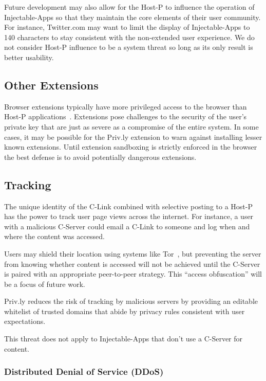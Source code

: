 \documentclass[letterpaper,twocolumn,10pt]{article}
\begin{document}
Future development may also allow for the Host-P to influence the operation of 
Injectable-Apps so that they maintain the core elements of their user community. 
For instance, Twitter.com may want to limit the display of Injectable-Apps to 140 
characters to stay consistent with the non-extended user experience. We do not 
consider Host-P influence to be a system threat so long as its only result is 
better usability.

\subsection{Other Extensions}

Browser extensions typically have more privileged access to the browser than 
Host-P applications~\cite{Bandhakavi2011,Carlini2012}. Extensions pose challenges 
to the security of the user's private key that are just as severe as a compromise 
of the entire system. In some cases, it may be possible for the Priv.ly extension 
to warn against installing lesser known extensions. Until extension sandboxing is 
strictly enforced in the browser the best defense is to avoid potentially 
dangerous extensions.

\subsection{Tracking}

The unique identity of the C-Link combined with selective posting to a Host-P has 
the power to track user page views across the internet. For instance, a user with 
a malicious C-Server could email a C-Link to someone and log when and where the 
content was accessed.

Users may shield their location using systems like Tor~\cite{Dingledine2004}, but 
preventing the server from knowing whether content is accessed will not be achieved
until the C-Server is paired with an appropriate peer-to-peer strategy. This
``access obfuscation'' will be a focus of future work.

Priv.ly reduces the risk of tracking by malicious servers by providing an editable whitelist 
of trusted domains that abide by privacy rules consistent with user expectations. 

This threat does not apply to Injectable-Apps that don't use a C-Server for
content.

\subsubsection{Distributed Denial of Service (DDoS)}
\end{document}
